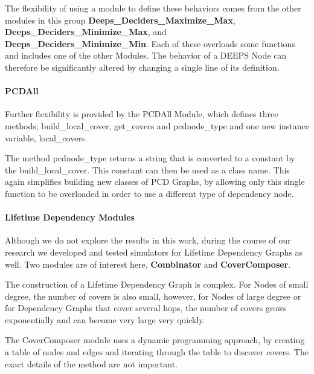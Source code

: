 The flexibility of using a module to define these behaviors comes from the other modules in this group {\bfseries Deeps\_Deciders\_Maximize\_Max}, {\bfseries Deeps\_Deciders\_Minimize\_Max}, and {\bfseries Deeps\_Deciders\_Minimize\_Min}. Each of these overloads some functions and includes one of the other Modules. The behavior of a DEEPS Node can therefore be significantly altered by changing a single line of its definition. 


\paragraph{PCDAll}

Further flexibility is provided by the PCDAll Module, which defines three methods; {\ttfamily build\_local\_cover}, {\ttfamily get\_covers} and {\ttfamily pcdnode\_type} and one new instance variable, {\ttfamily local\_covers}. 

The method {\ttfamily pcdnode\_type} returns a string that is converted to a constant by the {\ttfamily build\_local\_cover}. This constant can then be used as a class name. This again simplifies building new classes of PCD Graphs, by allowing only this single function to be overloaded in order to use a different type of dependency node. 



\paragraph{Lifetime Dependency Modules}

Although we do not explore the results in this work, during the course of our research we developed and tested simulators for Lifetime Dependency Graphs as well. Two modules are of interest here, {\bfseries Combinator} and {\bfseries CoverComposer}.

The construction of a Lifetime Dependency Graph is complex. For Nodes of small degree, the number of covers is also small, however, for Nodes of large degree or for Dependency Graphs that cover several hops, the number of covers grows exponentially and can become very large very quickly.



The CoverComposer module uses a dynamic programming approach, by creating a table of nodes and edges and iterating through the table to discover covers. The exact details of the method are not important. 

